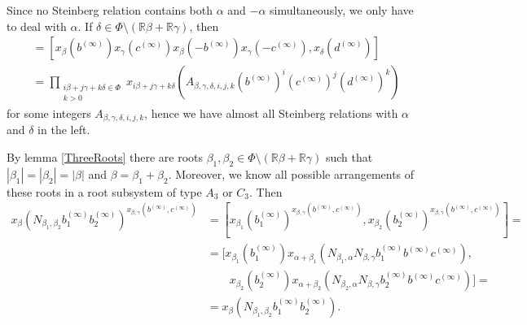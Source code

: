 \documentclass{article}
\theoremstyle{definition}
\theoremstyle{remark}
\begin{document}
 
Since no Steinberg relation contains both \(\alpha\) and \(-\alpha\) simultaneously, we only have to deal with \(\alpha\).  
 If \(\delta \in \Phi \setminus (\mathbb R \beta + \mathbb R \gamma)\), then
 \begin{align*}
  [x_{\beta, \gamma}(b^{(\infty)}, c^{(\infty)}), x_\delta(d^{(\infty)})] &= [x_\beta(b^{(\infty)}) x_\gamma(c^{(\infty)}) x_\beta(-b^{(\infty)}) x_\gamma(-c^{(\infty)}), x_\delta(d^{(\infty)})]\\
  &= \prod_{\substack{i\beta + j\gamma + k\delta \in \Phi\\ k > 0}} x_{i\beta + j\gamma + k\delta}(A_{\beta, \gamma, \delta, i, j, k} (b^{(\infty)})^i (c^{(\infty)})^j (d^{(\infty)})^k)
 \end{align*}
 for some integers \(A_{\beta, \gamma, \delta, i, j, k}\),
 hence we have almost all Steinberg relations with \(\alpha\) and \(\delta\) in the left.

By lemma \ref{ThreeRoots} there are roots \(\beta_1, \beta_2 \in \Phi \setminus (\mathbb R \beta + \mathbb R \gamma)\) such that \(|\beta_1| = |\beta_2| = |\beta|\) and \(\beta = \beta_1 + \beta_2\). Moreover, we know all possible arrangements of these roots in a root subsystem of type \(A_3\) or \(C_3\). Then
 \begin{align*}
  x_\beta(N_{\beta_1, \beta_2} b_1^{(\infty)} b_2^{(\infty)})^{x_{\beta, \gamma}(b^{(\infty)}, c^{(\infty)})} &= [x_{\beta_1}(b_1^{(\infty)})^{x_{\beta, \gamma}(b^{(\infty)}, c^{(\infty)})}, x_{\beta_2}(b_2^{(\infty)})^{x_{\beta, \gamma}(b^{(\infty)}, c^{(\infty)})}] =\\
  &= [x_{\beta_1}(b_1^{(\infty)}) x_{\alpha + \beta_1}(N_{\beta_1, \alpha} N_{\beta, \gamma} b_1^{(\infty)} b^{(\infty)} c^{(\infty)}),\\
  &\qquad x_{\beta_2}(b_2^{(\infty)}) x_{\alpha + \beta_2}(N_{\beta_2, \alpha} N_{\beta, \gamma} b_2^{(\infty)} b^{(\infty)} c^{(\infty)})] =\\
  &= x_\beta(N_{\beta_1, \beta_2} b_1^{(\infty)} b_2^{(\infty)}).
 \end{align*}
\end{document}
